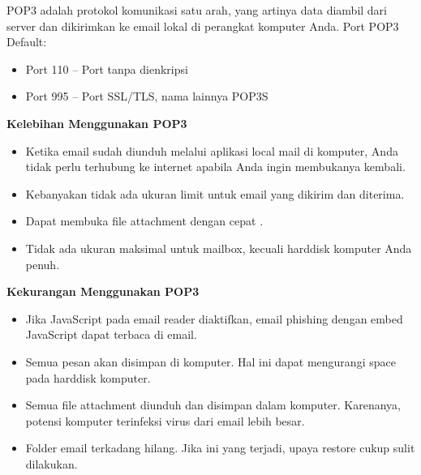 \documentclass[a4paper,12pt]{report}
\begin{document}
\begin{myEnumerate}
POP3 adalah protokol komunikasi satu arah, yang artinya data diambil dari server dan dikirimkan ke email lokal di perangkat komputer Anda. Port POP3 Default: \par
\noindent 
\begin{itemize}
\item Port 110 – Port tanpa dienkripsi \par
\noindent 
\item Port 995 – Port SSL/TLS, nama lainnya POP3S\end{itemize}
 \par
\vspace{12pt}
\textbf{Kelebihan Menggunakan POP3} \par
\noindent 
\begin{itemize}
\item Ketika email sudah diunduh melalui aplikasi local mail di komputer, Anda tidak perlu terhubung ke internet apabila Anda ingin membukanya kembali. \par
\noindent 
\item Kebanyakan tidak ada ukuran limit untuk email yang dikirim dan diterima. \par
\noindent 
\item Dapat membuka file attachment dengan cepat . \par
\noindent 
\item Tidak ada ukuran maksimal untuk mailbox, kecuali harddisk komputer Anda penuh.\end{itemize}
 \par
\vspace{12pt}
\textbf{Kekurangan Menggunakan POP3} \par
\noindent 
\begin{itemize}
\item Jika JavaScript pada email reader diaktifkan, email phishing dengan embed JavaScript dapat terbaca di email. \par
\noindent 
\item Semua pesan akan disimpan di komputer. Hal ini dapat mengurangi space pada harddisk komputer. \par
\noindent 
\item Semua file attachment diunduh dan disimpan dalam komputer. Karenanya, potensi komputer terinfeksi virus dari email lebih besar. \par
\noindent 
\item Folder email terkadang hilang. Jika ini yang terjadi, upaya restore cukup sulit dilakukan.\end{itemize}

\end{myEnumerate}
\end{document}
